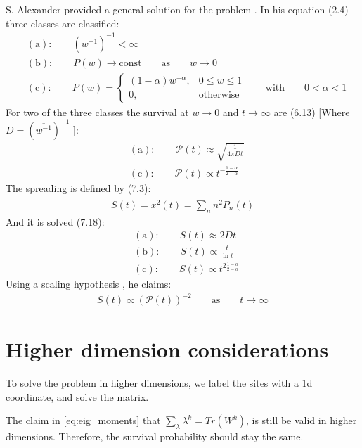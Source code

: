 \documentclass[onecolumn,fleqn]{revtex4}
\begin{document}
S. Alexander provided a general solution for the problem \cite{Alexander:1981:RMP}. In his equation (2.4) three classes are classified:
\begin{align} 
    &\mathrm{(a) : }\qquad (\overline{w^{-1}})^{-1} < \infty  \\
    &\mathrm{(b) : }\qquad P(w)\rightarrow \mathrm{const} \qquad\mathrm{as}\qquad w \rightarrow 0 \\
    &\mathrm{(c) : }\qquad P(w) = 
        \begin{cases} 
            (1-\alpha)w^{-\alpha} , & 0\le w \le 1 \\
            0, & \mathrm{otherwise}
        \end{cases}
        \qquad\mathrm{with}\qquad 0<\alpha<1
\end{align}
For two of the three classes the survival at $w\rightarrow 0$ and $t\rightarrow \infty$ are (6.13) [Where $D=(\overline{w^{-1}})^{-1}$ ]:
\begin{align}
&\mathrm{(a) : }\qquad \mathcal{P}(t) \approx \sqrt{\frac{1}{4\pi D t}}  \\
&\mathrm{(c) : }\qquad \mathcal{P}(t) \propto t^{-\frac{1-\alpha}{2-\alpha}}
\end{align}
The spreading is defined by (7.3):
\begin{align}\label{eq:spreading}
     S(t) = \overline{x^2(t)} = \sum_n n^2 P_n(t) 
\end{align}
And it is solved (7.18):
\begin{align}
    &\mathrm{(a) : }\qquad S(t) \approx 2Dt  \\
    &\mathrm{(b) : }\qquad S(t) \propto \frac{t}{\ln t}  \\
    &\mathrm{(c) : }\qquad S(t) \propto t^{2\frac{1-\alpha}{2-\alpha}}
\end{align}
Using a scaling hypothesis , he claims:
\begin{align}\label{eq:scaling_hypo}
S(t) \propto \left(\mathcal{P}(t)\right)^{-2} \qquad \mathrm{as}\qquad t\rightarrow \infty
\end{align}

\section{Higher dimension considerations}
To solve the problem in higher dimensions, we label the sites with a 1d coordinate, and solve the matrix.

The claim in \eqref{eq:eig_moments} that $\sum_\lambda \lambda^k = Tr (W^k)$, is still be valid in higher dimensions. Therefore, the survival probability should stay the same.
\end{document}
